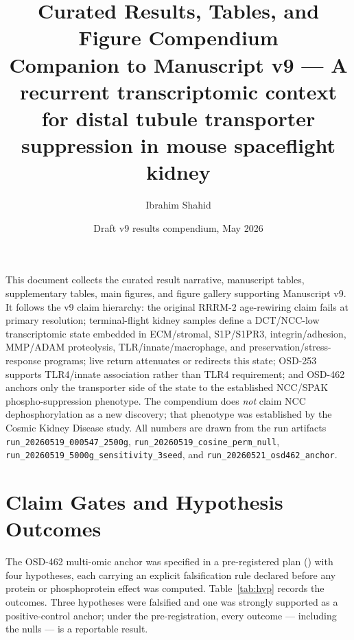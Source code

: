 \documentclass[10pt]{article}
\title{\textbf{Curated Results, Tables, and Figure Compendium}\\[0.3em]
\large Companion to Manuscript v9 --- A recurrent transcriptomic context for distal tubule transporter suppression in mouse spaceflight kidney}
\author{Ibrahim Shahid}
\date{Draft v9 results compendium, May 2026}
\newcommand{\code}[1]{\texttt{#1}}
\begin{document}
\maketitle
\thispagestyle{fancy}

\noindent
This document collects the curated result narrative, manuscript tables, supplementary tables, main figures, and figure gallery supporting Manuscript v9. It follows the v9 claim hierarchy: the original RRRM-2 age-rewiring claim fails at primary resolution; terminal-flight kidney samples define a DCT/NCC-low transcriptomic state embedded in ECM/stromal, S1P/S1PR3, integrin/adhesion, MMP/ADAM proteolysis, TLR/innate/macrophage, and preservation/stress-response programs; live return attenuates or redirects this state; OSD-253 supports TLR4/innate association rather than TLR4 requirement; and OSD-462 anchors only the transporter side of the state to the established NCC/SPAK phospho-suppression phenotype. The compendium does \emph{not} claim NCC dephosphorylation as a new discovery; that phenotype was established by the Cosmic Kidney Disease study. All numbers are drawn from the run artifacts \code{run\_20260519\_000547\_2500g}, \code{run\_20260519\_cosine\_perm\_null}, \code{run\_20260519\_5000g\_sensitivity\_3seed}, and \code{run\_20260521\_osd462\_anchor}.

\tableofcontents
\clearpage

\section{Claim Gates and Hypothesis Outcomes}

The OSD-462 multi-omic anchor was specified in a pre-registered plan () with four hypotheses, each carrying an explicit falsification rule declared before any protein or phosphoprotein effect was computed. Table~\ref{tab:hyp} records the outcomes. Three hypotheses were falsified and one was strongly supported as a positive-control anchor; under the pre-registration, every outcome --- including the nulls --- is a reportable result.
\end{document}
